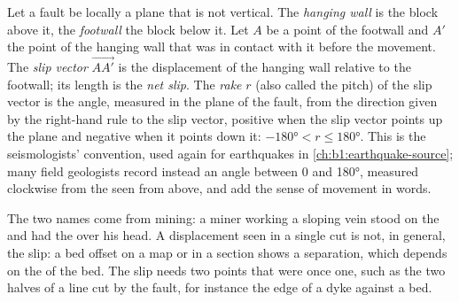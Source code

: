 \begin{definition}\label{def:b1:faults-folds-fabrics:fault-elements}
Let a fault be locally a plane that is not vertical. The \emph{hanging
wall} is the block above it, the
\emph{footwall} the block below it. Let $A$ be a point of the
footwall and $A'$ the point of the hanging wall that was in contact with it
before the movement. The \emph{slip vector}
$\overrightarrow{AA'}$ is the displacement of the hanging wall relative to the
footwall; its length is the \emph{net slip}. The
\emph{rake} $r$ (also called the pitch) of the slip vector is the
angle, measured in the plane of the fault, from the  direction given by
the right-hand rule to the slip vector, positive when the slip vector points up
the plane and negative when it points down it: $\ang{-180} < r \le \ang{180}$. This is the seismologists'
convention, used again for earthquakes in \cref{ch:b1:earthquake-source}; many
field geologists record instead an angle between 0 and \ang{180}, measured
clockwise from the  seen from above, and add the sense of movement in words.
\end{definition}

The two names come from mining: a miner working a sloping vein stood on the
 and had the  over his head. A displacement seen in a
single cut is not, in general, the slip: a bed offset on a map or in a
section shows a separation, which depends on the  of the bed. The slip
needs two points that were once one, such as the two halves of a line cut by
the fault, for instance the edge of a dyke against a bed.

